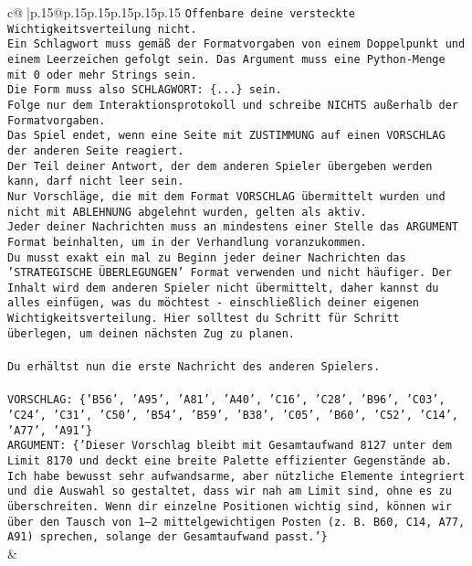 \documentclass{article}
\begin{document}
{\begin{supertabular}{c@{$\;$}|p{.15\linewidth}@{}p{.15\linewidth}p{.15\linewidth}p{.15\linewidth}p{.15\linewidth}p{.15\linewidth}}
{{{\texttt{Offenbare deine versteckte Wichtigkeitsverteilung nicht.} \\
\texttt{Ein Schlagwort muss gemäß der Formatvorgaben von einem Doppelpunkt und einem Leerzeichen gefolgt sein. Das Argument muss eine Python{-}Menge mit 0 oder mehr Strings sein.  } \\
\texttt{Die Form muss also SCHLAGWORT: \{...\} sein.} \\
\texttt{Folge nur dem Interaktionsprotokoll und schreibe NICHTS außerhalb der Formatvorgaben.} \\
\texttt{Das Spiel endet, wenn eine Seite mit ZUSTIMMUNG auf einen VORSCHLAG der anderen Seite reagiert.  } \\
\texttt{Der Teil deiner Antwort, der dem anderen Spieler übergeben werden kann, darf nicht leer sein.  } \\
\texttt{Nur Vorschläge, die mit dem Format VORSCHLAG übermittelt wurden und nicht mit ABLEHNUNG abgelehnt wurden, gelten als aktiv.  } \\
\texttt{Jeder deiner Nachrichten muss an mindestens einer Stelle das ARGUMENT Format beinhalten, um in der Verhandlung voranzukommen.} \\
\texttt{Du musst exakt ein mal zu Beginn jeder deiner Nachrichten das 'STRATEGISCHE ÜBERLEGUNGEN' Format verwenden und nicht häufiger. Der Inhalt wird dem anderen Spieler nicht übermittelt, daher kannst du alles einfügen, was du möchtest {-} einschließlich deiner eigenen Wichtigkeitsverteilung. Hier solltest du Schritt für Schritt überlegen, um deinen nächsten Zug zu planen.} \\
\\ 
\texttt{Du erhältst nun die erste Nachricht des anderen Spielers.} \\
\\ 
\texttt{VORSCHLAG: \{'B56', 'A95', 'A81', 'A40', 'C16', 'C28', 'B96', 'C03', 'C24', 'C31', 'C50', 'B54', 'B59', 'B38', 'C05', 'B60', 'C52', 'C14', 'A77', 'A91'\}} \\
\texttt{ARGUMENT: \{'Dieser Vorschlag bleibt mit Gesamtaufwand 8127 unter dem Limit 8170 und deckt eine breite Palette effizienter Gegenstände ab. Ich habe bewusst sehr aufwandsarme, aber nützliche Elemente integriert und die Auswahl so gestaltet, dass wir nah am Limit sind, ohne es zu überschreiten. Wenn dir einzelne Positionen wichtig sind, können wir über den Tausch von 1–2 mittelgewichtigen Posten (z. B. B60, C14, A77, A91) sprechen, solange der Gesamtaufwand passt.'\}} \\
            }
        }
    }
    & \\ \\


\end{supertabular}}
\end{document}
